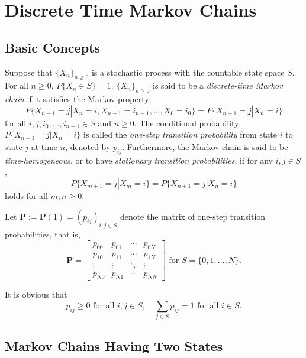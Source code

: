 \chapter{Discrete Time Markov Chains}

\section{Basic Concepts}

\begin{definition}
  Suppose that \(\{X_n\}_{n \geq 0}\) is a stochastic process with the countable state space \(S\). For all \(n \geq 0\), \(P\{X_n \in S\} = 1\). \(\{X_n\}_{n \geq 0}\) is said to be a \emph{discrete-time Markov chain} if it satisfies the Markov property:
  \[
    P\{X_{n+1} = j | X_n = i, X_{n-1} = i_{n-1}, \ldots, X_0 = i_0\} = P\{X_{n+1} = j | X_n = i\}
  \]
  for all \(i, j, i_0, \ldots, i_{n-1} \in S\) and \(n \geq 0\).
  The conditional probability \(P\{X_{n+1} = j | X_n = i\}\) is called the \emph{one-step transition probability} from state \(i\) to state \(j\) at time \(n\), denoted by \(p_{ij}\). Furthermore, the Markov chain is said to be \emph{time-homogeneous}, or to have \emph{stationary transition probabilities}, if for any \(i, j \in S\),
  \[
    P\{X_{m+1} = j | X_m = i\} = P\{X_{n+1} = j | X_n = i\}
  \]
  holds for all \(m, n \geq 0\).
\end{definition}

\begin{definition}
  Let \(\mathbf{P} := \mathbf{P}(1) = (p_{ij})_{i, j \in S}\) denote the matrix of one-step transition probabilities, that is,
  \[
    \mathbf{P} = \begin{bmatrix}
      p_{00} & p_{01} & \cdots & p_{0N} \\
      p_{10} & p_{11} & \cdots & p_{1N} \\
      \vdots & \vdots & \ddots & \vdots \\
      p_{N0} & p_{N1} & \cdots & p_{NN}
    \end{bmatrix}
    \text{ for } S = \{0, 1, \ldots, N\}.
  \]
\end{definition}
It is obvious that
\[
  p_{ij} \geq 0 \text{ for all } i, j \in S, \quad \sum_{j \in S} p_{ij} = 1 \text{ for all } i \in S.
\]

\section{Markov Chains Having Two States}

